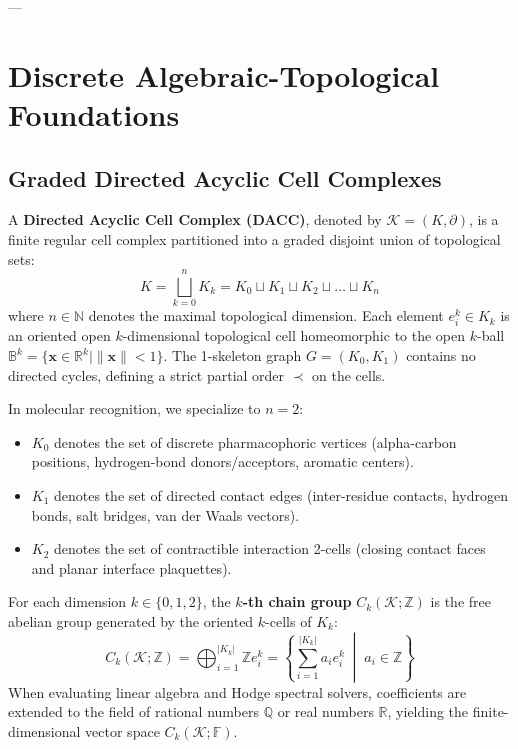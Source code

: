 ---

\section{Discrete Algebraic-Topological Foundations}
\label{sec:discrete_topological_foundations}

\subsection{Graded Directed Acyclic Cell Complexes}
\begin{definition}
A \textbf{Directed Acyclic Cell Complex (DACC)}, denoted by $\mathcal{K} = (K, \partial)$, is a finite regular cell complex partitioned into a graded disjoint union of topological sets:
\begin{equation}
    K = \bigsqcup_{k=0}^n K_k = K_0 \sqcup K_1 \sqcup K_2 \sqcup \dots \sqcup K_n
\end{equation}
where $n \in \mathbb{N}$ denotes the maximal topological dimension. Each element $e_i^k \in K_k$ is an oriented open $k$-dimensional topological cell homeomorphic to the open $k$-ball $\mathbb{B}^k = \{ \mathbf{x} \in \mathbb{R}^k \mid \|\mathbf{x}\| < 1 \}$. The 1-skeleton graph $G = (K_0, K_1)$ contains no directed cycles, defining a strict partial order $\prec$ on the cells.
\end{definition}

In molecular recognition, we specialize to $n = 2$:
\begin{itemize}[leftmargin=1.2cm]
    \item $K_0$ denotes the set of discrete pharmacophoric vertices (alpha-carbon positions, hydrogen-bond donors/acceptors, aromatic centers).
    \item $K_1$ denotes the set of directed contact edges (inter-residue contacts, hydrogen bonds, salt bridges, van der Waals vectors).
    \item $K_2$ denotes the set of contractible interaction 2-cells (closing contact faces and planar interface plaquettes).
\end{itemize}

\begin{definition}
For each dimension $k \in \{0, 1, 2\}$, the \textbf{$k$-th chain group} $C_k(\mathcal{K}; \mathbb{Z})$ is the free abelian group generated by the oriented $k$-cells of $K_k$:
\begin{equation}
    C_k(\mathcal{K}; \mathbb{Z}) = \bigoplus_{i=1}^{|K_k|} \mathbb{Z} e_i^k = \left\{ \sum_{i=1}^{|K_k|} a_i e_i^k \;\middle|\; a_i \in \mathbb{Z} \right\}
\end{equation}
When evaluating linear algebra and Hodge spectral solvers, coefficients are extended to the field of rational numbers $\mathbb{Q}$ or real numbers $\mathbb{R}$, yielding the finite-dimensional vector space $C_k(\mathcal{K}; \mathbb{F})$.
\end{definition}

